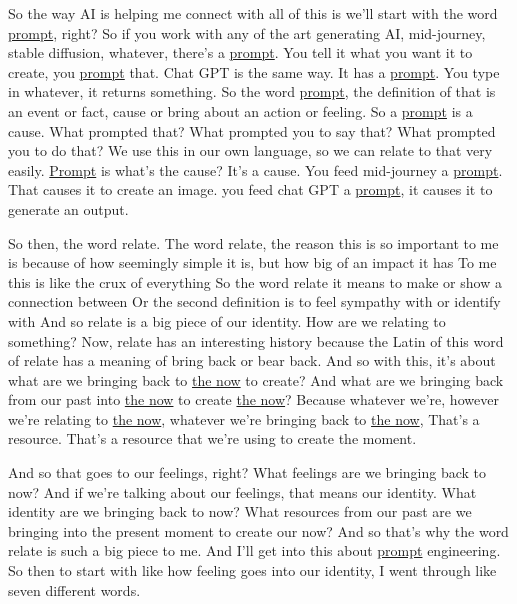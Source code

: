 So the way AI is helping me connect with all of this is we'll start with the word \hyperlink{gloss:prompt}{prompt}, right? So if you work with any of the art generating AI, mid-journey, stable diffusion, whatever, there's a \hyperlink{gloss:prompt}{prompt}. You tell it what you want it to create, you \hyperlink{gloss:prompt}{prompt} that. Chat GPT is the same way. It has a \hyperlink{gloss:prompt}{prompt}. You type in whatever, it returns something. So the word \hyperlink{gloss:prompt}{prompt}, the definition of that is an event or fact, cause or bring about an action or feeling. So a \hyperlink{gloss:prompt}{prompt} is a cause. What prompted that? What prompted you to say that? What prompted you to do that? We use this in our own language, so we can relate to that very easily. \hyperlink{gloss:prompt}{Prompt} is what's the cause? It's a cause. You feed mid-journey a \hyperlink{gloss:prompt}{prompt}. That causes it to create an image. you feed chat GPT a \hyperlink{gloss:prompt}{prompt}, it causes it to generate an output. 

So then, the word relate. The word relate, the reason this is so important to me is because of how seemingly simple it is, but how big of an impact it has To me this is like the crux of everything So the word relate it means to make or show a connection between Or the second definition is to feel sympathy with or identify with And so relate is a big piece of our identity. How are we relating to something? Now, relate has an interesting history because the Latin of this word of relate has a meaning of bring back or bear back. And so with this, it's about what are we bringing back to \hyperlink{gloss:the_now}{the now} to create? And what are we bringing back from our past into \hyperlink{gloss:the_now}{the now} to create \hyperlink{gloss:the_now}{the now}? Because whatever we're, however we're relating to \hyperlink{gloss:the_now}{the now}, whatever we're bringing back to \hyperlink{gloss:the_now}{the now}, That's a resource. That's a resource that we're using to create the moment. 

And so that goes to our feelings, right? What feelings are we bringing back to now? And if we're talking about our feelings, that means our identity. What identity are we bringing back to now? What resources from our past are we bringing into the present moment to create our now? And so that's why the word relate is such a big piece to me. And I'll get into this about \hyperlink{gloss:prompt}{prompt} engineering. So then to start with like how feeling goes into our identity, I went through like seven different words. 

